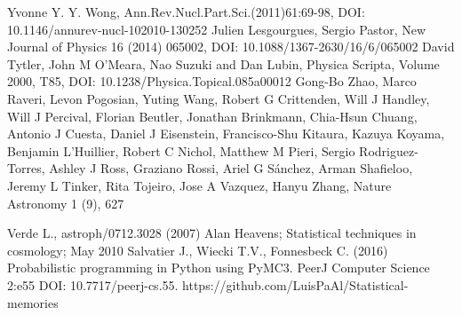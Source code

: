 \documentclass[10.5pt,prb,
               showpacs,            %
               preprintnumbers,     %
               aps,                 %
               prl,          	    %
               letterpaper,             %
               superscriptaddress,      %
               nofootinbib,         %
               tightenlines,        %
               floats,floatfix      %
               ,usenatbib]{revtex4-1}%
\begin{document}
%
\begin{thebibliography}{9}
Yvonne Y. Y. Wong, Ann.Rev.Nucl.Part.Sci.(2011)61:69-98, DOI: 10.1146/annurev-nucl-102010-130252
Julien Lesgourgues, Sergio Pastor, New Journal of Physics 16 (2014) 065002, DOI: 10.1088/1367-2630/16/6/065002
 David Tytler, John M O'Meara, Nao Suzuki and Dan Lubin, Physica Scripta, Volume 2000, T85, DOI: 	10.1238/Physica.Topical.085a00012 
Gong-Bo Zhao, Marco Raveri, Levon Pogosian, Yuting Wang, Robert G Crittenden, Will J Handley, Will J Percival, Florian Beutler, Jonathan Brinkmann, Chia-Hsun Chuang, Antonio J Cuesta, Daniel J Eisenstein, Francisco-Shu Kitaura, Kazuya Koyama, Benjamin L’Huillier, Robert C Nichol, Matthew M Pieri, Sergio Rodriguez-Torres, Ashley J Ross, Graziano Rossi, Ariel G Sánchez, Arman Shafieloo, Jeremy L Tinker, Rita Tojeiro, Jose A Vazquez, Hanyu Zhang, Nature Astronomy 1 (9), 627

 Verde L., astroph/0712.3028 (2007)
 Alan Heavens; Statistical techniques in cosmology; May 2010
Salvatier J., Wiecki T.V., Fonnesbeck C. (2016) Probabilistic programming in Python using PyMC3. PeerJ Computer Science 2:e55 DOI: 10.7717/peerj-cs.55.
 https://github.com/LuisPaAl/Statistical-memories
\end{thebibliography}
\end{document}

